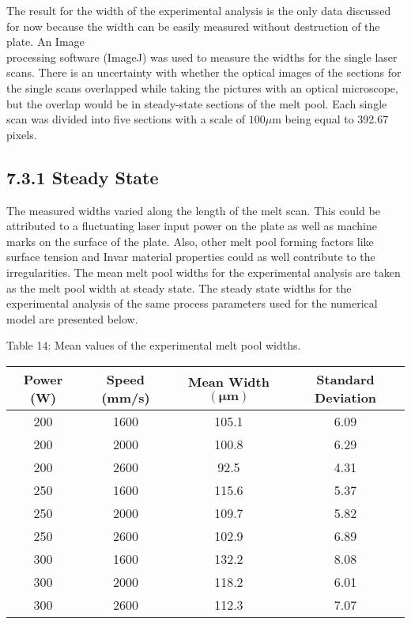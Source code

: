 \documentclass[10pt]{article}
\begin{document}
The result for the width of the experimental analysis is the only data discussed for now because the width can be easily measured without destruction of the plate. An Image\\
processing software (ImageJ) was used to measure the widths for the single laser scans. There is an uncertainty with whether the optical images of the sections for the single scans overlapped while taking the pictures with an optical microscope, but the overlap would be in steady-state sections of the melt pool. Each single scan was divided into five sections with a scale of $100 \mu \mathrm{m}$ being equal to 392.67 pixels.

\subsection*{7.3.1 Steady State}
The measured widths varied along the length of the melt scan. This could be attributed to a fluctuating laser input power on the plate as well as machine marks on the surface of the plate. Also, other melt pool forming factors like surface tension and Invar material properties could as well contribute to the irregularities. The mean melt pool widths for the experimental analysis are taken as the melt pool width at steady state. The steady state widths for the experimental analysis of the same process parameters used for the numerical model are presented below.

Table 14: Mean values of the experimental melt pool widths.

\begin{center}
\begin{tabular}{|c|c|c|c|}
\hline
Power (W) & Speed (mm/s) & Mean Width $(\boldsymbol{\mu m})$ & Standard Deviation \\
\hline
200 & 1600 & 105.1 & 6.09 \\
\hline
200 & 2000 & 100.8 & 6.29 \\
\hline
200 & 2600 & 92.5 & 4.31 \\
\hline
250 & 1600 & 115.6 & 5.37 \\
\hline
250 & 2000 & 109.7 & 5.82 \\
\hline
250 & 2600 & 102.9 & 6.89 \\
\hline
300 & 1600 & 132.2 & 8.08 \\
\hline
300 & 2000 & 118.2 & 6.01 \\
\hline
300 & 2600 & 112.3 & 7.07 \\
\hline
\end{tabular}
\end{center}
\end{document}
